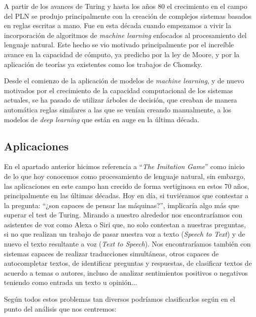 A partir de los avances de Turing y hasta los años 80 el crecimiento en el campo del PLN se produjo principalmente con la creación de complejos sistemas basados en reglas escritas a mano. Fue en esta década cuando empezamos a vivir la incorporación de algoritmos de \textit{machine learning} enfocados al procesamiento del lenguaje natural. Este hecho se vio motivado principalmente por el increíble avance en la capacidad de cómputo, ya predicho por la ley de Moore, y por la aplicación de teorías ya existentes como los trabajos de Chomsky. 


Desde el comienzo de la aplicación de modelos de \textit{machine learning}, y de nuevo motivados por el crecimiento de la capacidad computacional de los sistemas actuales, se ha pasado de utilizar árboles de decisión, que creaban de manera automática reglas similares a las que se venían creando manualmente, a los modelos de \textit{deep learning} que están en auge en la última década. 

\subsection{Aplicaciones}

En el apartado anterior hicimos referencia a ``\textit{The Imitation Game}'' como inicio de lo que hoy conocemos como procesamiento de lenguaje natural, sin embargo, las aplicaciones en este campo han crecido de forma vertiginosa en estos 70 años, principalmente en las últimas décadas. Hoy en día, si tuviéramos que contestar a la pregunta: ``¿son capaces de pensar las máquinas?'', implicaría algo más que superar el test de Turing. Mirando a nuestro alrededor nos encontraríamos con asistentes de voz como Alexa o Siri que, no solo contestan a nuestras preguntas, si no que realizan un trabajo de pasar nuestra voz a texto (\textit{Speech to Text}) y de nuevo el texto resultante a voz (\textit{Text to Speech}). Nos encontraríamos también con sistemas capaces de realizar traducciones simultáneas, otros capaces de autocompletar textos, de identificar preguntas y respuestas, de clasificar textos de acuerdo a temas o autores, incluso de analizar sentimientos positivos o negativos teniendo como entrada un texto u opinión... 


Según \cite{goldberg_2017} todos estos problemas tan diversos podríamos clasificarlos según en el punto del análisis que nos centremos: 

